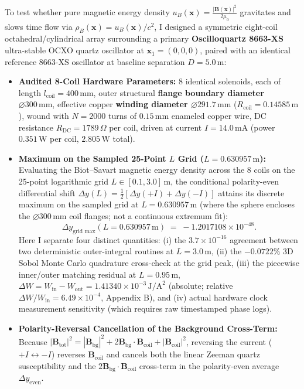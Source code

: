 \documentclass[10pt,a4paper]{article}
\begin{document}
\par
To test whether pure magnetic energy density $u_B(\mathbf{x}) = \frac{|\mathbf{B}(\mathbf{x})|^2}{2\mu_0}$ gravitates and slows time flow via $\rho_B(\mathbf{x}) = u_B(\mathbf{x})/c^2$, I designed a symmetric eight-coil octahedral/cylindrical array surrounding a primary \textbf{Oscilloquartz 8663-XS} ultra-stable OCXO quartz oscillator at $\mathbf{x}_1 = (0,0,0)$, paired with an identical reference 8663-XS oscillator at baseline separation $D = 5.0\,\text{m}$:
\begin{itemize}\setlength{\itemsep}{1pt}\setlength{\parskip}{0pt}\setlength{\topsep}{1pt}
  \item \textbf{Audited 8-Coil Hardware Parameters:} 8 identical solenoids, each of length $l_{\text{coil}} = 400\,\text{mm}$, outer structural \textbf{flange boundary diameter $\varnothing 300\,\text{mm}$}, effective copper \textbf{winding diameter $\varnothing 291.7\,\text{mm}$} ($R_{\text{coil}} = 0.14585\,\text{m}$), wound with $N = 2000$ turns of $0.15\,\text{mm}$ enameled copper wire, DC resistance $R_{\text{DC}} = 1789\,\Omega$ per coil, driven at current $I = 14.0\,\text{mA}$ (power $0.351\,\text{W}$ per coil, $2.805\,\text{W}$ total).
  \item \textbf{Maximum on the Sampled 25-Point $L$ Grid ($L = 0.630957\,\text{m}$):} Evaluating the Biot--Savart magnetic energy density across the 8 coils on the 25-point logarithmic grid $L \in [0.1, 3.0]\,\text{m}$, the conditional polarity-even differential shift $\Delta y(L) = \frac{1}{2}[\Delta y(+I) + \Delta y(-I)]$ attains its discrete maximum on the sampled grid at \textbf{$L = 0.630957\,\text{m}$} (where the sphere encloses the $\varnothing 300\,\text{mm}$ coil flanges; not a continuous extremum fit):
  \begin{equation}
    \Delta y_{\text{grid max}}(L = 0.630957\,\text{m}) \;=\; -1.2017108\times 10^{-48}.
  \end{equation}
  Here I separate four distinct quantities: (i) the $3.7\times 10^{-16}$ agreement between two deterministic outer-integral routines at $L=3.0\,\text{m}$, (ii) the $-0.0722\%$ 3D Sobol Monte Carlo quadrature cross-check at the grid peak, (iii) the piecewise inner/outer matching residual at $L=0.95\,\text{m}$, $\Delta W = W_{\text{in}} - W_{\text{out}} = 1.41340\times 10^{-3}\,\text{J/A}^2$ (absolute; relative $\Delta W/W_{\text{in}} = 6.49\times 10^{-4}$, Appendix B), and (iv) actual hardware clock measurement sensitivity (which requires raw timestamped phase logs).
  \item \textbf{Polarity-Reversal Cancellation of the Background Cross-Term:} Because $|\mathbf{B}_{\text{tot}}|^2 = |\mathbf{B}_{\text{bg}}|^2 + 2\mathbf{B}_{\text{bg}}\cdot\mathbf{B}_{\text{coil}} + |\mathbf{B}_{\text{coil}}|^2$, reversing the current ($+I \leftrightarrow -I$) reverses $\mathbf{B}_{\text{coil}}$ and cancels both the linear Zeeman quartz susceptibility and the $2\mathbf{B}_{\text{bg}}\cdot\mathbf{B}_{\text{coil}}$ cross-term in the polarity-even average $\Delta y_{\text{even}}$.
\end{itemize}
\end{document}
